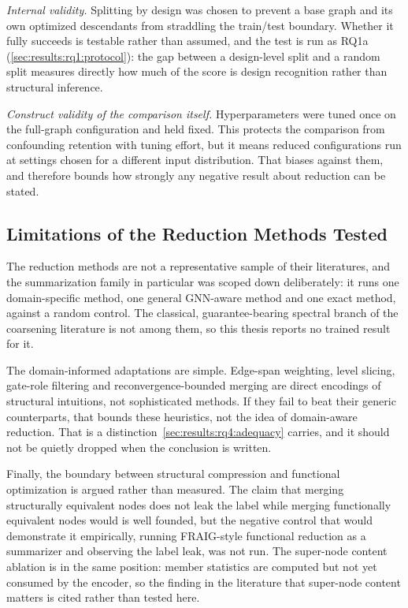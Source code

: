 \emph{Internal validity.} Splitting by design was chosen to prevent a base graph and its own
optimized descendants from straddling the train/test boundary. Whether it fully succeeds is
testable rather than assumed, and the test is run as RQ1a
(\ref{sec:results:rq1:protocol}): the gap between a design-level split and a random split
measures directly how much of the score is design recognition rather than structural
inference.

\emph{Construct validity of the comparison itself.} Hyperparameters were tuned once on the
full-graph configuration and held fixed. This protects the comparison from confounding
retention with tuning effort, but it means reduced configurations run at settings chosen for
a different input distribution. That biases against them, and therefore bounds how
strongly any negative result about reduction can be stated.

\subsection{Limitations of the Reduction Methods Tested}
\label{sec:discussion:limitations:methods}
The reduction methods are not a representative sample of their literatures, and the
summarization family in particular was scoped down deliberately: it runs one domain-specific
method, one general GNN-aware method and one exact method, against a random control. The
classical, guarantee-bearing spectral branch of the coarsening literature is not among them,
so this thesis reports no trained result for it.

The domain-informed adaptations are simple. Edge-span weighting, level slicing, gate-role
filtering and reconvergence-bounded merging are direct encodings of structural intuitions,
not sophisticated methods. If they fail to beat their generic counterparts, that bounds
these heuristics, not the idea of domain-aware reduction. That is a
distinction~\ref{sec:results:rq4:adequacy} carries, and it should not be quietly dropped
when the conclusion is written.

Finally, the boundary between structural compression and functional optimization is argued
rather than measured. The claim that merging structurally equivalent nodes does not leak the
label while merging functionally equivalent nodes would is well founded, but the negative
control that would demonstrate it empirically, running FRAIG-style functional reduction
\citep{mishchenko2005fraig} as a summarizer and observing the label leak, was not run. The
super-node content ablation is in the same position:
member statistics are computed but not yet consumed by the encoder, so the finding in the
literature that super-node content matters is cited rather than tested here.


